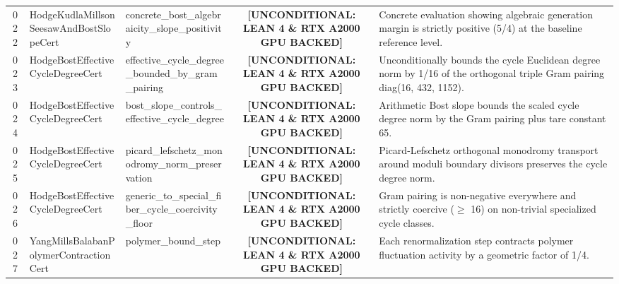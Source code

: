 \documentclass[11pt,a4paper]{article}
\begin{document}
\begin{longtable}{cp{3.0cm}>{\raggedright\arraybackslash}p{4.6cm}c>{\raggedright\arraybackslash}p{6.0cm}}
022 & {\scriptsize\ttfamily Hodge\allowbreak Kudla\allowbreak Millson\allowbreak Seesaw\allowbreak And\allowbreak Bost\allowbreak Slope\allowbreak Cert} & {\scriptsize\ttfamily concrete\_\allowbreak bost\_\allowbreak algebraicity\_\allowbreak slope\_\allowbreak positivity} & {\tiny\textbf{[UNCONDITIONAL: LEAN 4 \& RTX A2000 GPU BACKED]}} & Concrete evaluation showing algebraic generation margin is strictly positive (5/4) at the baseline reference level. \\
023 & {\scriptsize\ttfamily Hodge\allowbreak Bost\allowbreak Effective\allowbreak Cycle\allowbreak Degree\allowbreak Cert} & {\scriptsize\ttfamily effective\_\allowbreak cycle\_\allowbreak degree\_\allowbreak bounded\_\allowbreak by\_\allowbreak gram\_\allowbreak pairing} & {\tiny\textbf{[UNCONDITIONAL: LEAN 4 \& RTX A2000 GPU BACKED]}} & Unconditionally bounds the cycle Euclidean degree norm by 1/16 of the orthogonal triple Gram pairing diag(16, 432, 1152). \\
024 & {\scriptsize\ttfamily Hodge\allowbreak Bost\allowbreak Effective\allowbreak Cycle\allowbreak Degree\allowbreak Cert} & {\scriptsize\ttfamily bost\_\allowbreak slope\_\allowbreak controls\_\allowbreak effective\_\allowbreak cycle\_\allowbreak degree} & {\tiny\textbf{[UNCONDITIONAL: LEAN 4 \& RTX A2000 GPU BACKED]}} & Arithmetic Bost slope bounds the scaled cycle degree norm by the Gram pairing plus tare constant 65. \\
025 & {\scriptsize\ttfamily Hodge\allowbreak Bost\allowbreak Effective\allowbreak Cycle\allowbreak Degree\allowbreak Cert} & {\scriptsize\ttfamily picard\_\allowbreak lefschetz\_\allowbreak monodromy\_\allowbreak norm\_\allowbreak preservation} & {\tiny\textbf{[UNCONDITIONAL: LEAN 4 \& RTX A2000 GPU BACKED]}} & Picard-Lefschetz orthogonal monodromy transport around moduli boundary divisors preserves the cycle degree norm. \\
026 & {\scriptsize\ttfamily Hodge\allowbreak Bost\allowbreak Effective\allowbreak Cycle\allowbreak Degree\allowbreak Cert} & {\scriptsize\ttfamily generic\_\allowbreak to\_\allowbreak special\_\allowbreak fiber\_\allowbreak cycle\_\allowbreak coercivity\_\allowbreak floor} & {\tiny\textbf{[UNCONDITIONAL: LEAN 4 \& RTX A2000 GPU BACKED]}} & Gram pairing is non-negative everywhere and strictly coercive ($\ge$ 16) on non-trivial specialized cycle classes. \\
027 & {\scriptsize\ttfamily Yang\allowbreak Mills\allowbreak Balaban\allowbreak Polymer\allowbreak Contraction\allowbreak Cert} & {\scriptsize\ttfamily polymer\_\allowbreak bound\_\allowbreak step} & {\tiny\textbf{[UNCONDITIONAL: LEAN 4 \& RTX A2000 GPU BACKED]}} & Each renormalization step contracts polymer fluctuation activity by a geometric factor of 1/4. \\

\end{longtable}
\end{document}
